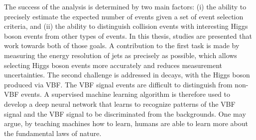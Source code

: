 The success of the \HWWdet analysis is determined by two main factors: 
(i) the ability to precisely estimate the expected number of events given a set of event selection criteria, and (ii) the ability to distinguish collision events with interesting Higgs boson events from other types of events.
In this thesis, studies are presented that work towards both of those goals.
A contribution to the first task is made by measuring the energy resolution of jets as precisely as possible, which allows selecting Higgs boson events more accurately and reduces measurement uncertainties.
The second challenge is addressed in \HWWdet decays, with the Higgs boson produced via VBF.
The VBF signal events are difficult to distinguish from non-VBF events. 
A supervised machine learning algorithm is therefore used to develop a deep neural network that learns to recognize patterns of the VBF signal and the VBF signal to be discriminated from the backgrounds.
One may argue, by teaching machines how to learn, humans are able to learn more about the fundamental laws of nature. 





